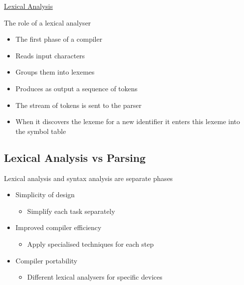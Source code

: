 \documentclass{article}[18pt]
\begin{document}
\begin{center}
\underline{\huge Lexical Analysis}
\end{center}
The role of a lexical analyser
\begin{itemize}
	\item The first phase of a compiler
	\item Reads input characters
	\item Groups them into lexemes
	\item Produces as output a sequence of tokens
	\item The stream of tokens is sent to the parser
	\item When it discovers the lexeme for a new identifier it enters this lexeme into the symbol table
\end{itemize}
\subsection{Lexical Analysis vs Parsing}
Lexical analysis and syntax analysis are separate phases
\begin{itemize}
	\item Simplicity of design
	\begin{itemize}
		\item Simplify each task separately
	\end{itemize}
	\item Improved compiler efficiency
	\begin{itemize}
		\item Apply specialised techniques for each step
	\end{itemize}
	\item Compiler portability
	\begin{itemize}
		\item Different lexical analysers for specific devices
	\end{itemize}
\end{itemize}
\end{document}
